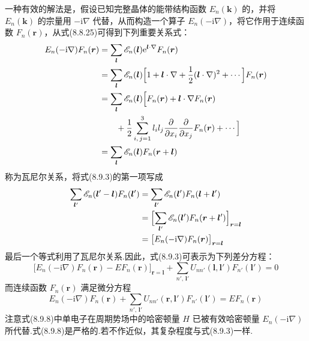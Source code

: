 一种有效的解法是，假设已知完整晶体的能带结构函数 $E_{n}(\boldsymbol{k})$ 的，并将 $E_{n}(\boldsymbol{k})$ 的宗量用 $-\mathrm{i}\nabla$ 代替，从而构造一个算子 $E_{n}(-\mathrm{i}\nabla)$，将它作用于连续函数 $F_{n}(\boldsymbol{r})$，从式(8.8.25)可得到下列重要关系式：
\begin{equation}
\begin{aligned}
  E_{n}(-\mathrm{i}\nabla)F_{n}(\boldsymbol{r})
  &=\sum_{\boldsymbol{l}}\mathscr{E}_{n}(\boldsymbol{l})\mathrm{e}^{\boldsymbol{l}\cdot\nabla}F_{n}(\boldsymbol{r})\\
  &=\sum_{\boldsymbol{l}}\mathscr{E}_{n}(\boldsymbol{l})\Bigl[1+\boldsymbol{l}\cdot\nabla+\frac{1}{2}(\boldsymbol{l}\cdot\nabla)^{2}+\cdots\Bigr]F_{n}(\boldsymbol{r})\\
  &=\sum_{\boldsymbol{l}}\mathscr{E}_{n}(\boldsymbol{l})\Bigl[F_{n}(\boldsymbol{r})+\boldsymbol{l}\cdot\nabla F_{n}(\boldsymbol{r})\\
  &\qquad+\frac{1}{2}\sum_{i,\,j=1}^{3}l_{i}l_{j}\frac{\partial}{\partial x_{i}}\frac{\partial}{\partial x_{j}}F_{n}(\boldsymbol{r})+\cdots\Bigr]\\
  &=\sum_{\boldsymbol{l}}\mathscr{E}_{n}(\boldsymbol{l})F_{n}(\boldsymbol{r}+\boldsymbol{l})
\end{aligned}
\end{equation}
称为瓦尼尔关系，将式(8.9.3)的第一项写成
\begin{equation}
\begin{aligned}
  \sum_{\boldsymbol{l}'}\mathscr{E}_{n}(\boldsymbol{l}'-\boldsymbol{l})F_{n}(\boldsymbol{l}')
  &=\sum_{\boldsymbol{l}'}\mathscr{E}_{n}(\boldsymbol{l}')F_{n}(\boldsymbol{l}+\boldsymbol{l}')\\
  &=\Bigl[\sum_{\boldsymbol{l}'}\mathscr{E}_{n}(\boldsymbol{l}')F_{n}(\boldsymbol{r}+\boldsymbol{l}')\Bigr]_{\boldsymbol{r}=\boldsymbol{l}}\\
  &=\bigl[E_{n}(-\mathrm{i}\nabla)F_{n}(\boldsymbol{r})\bigr]_{\boldsymbol{r}=\boldsymbol{l}}
\end{aligned}
\end{equation}
最后一个等式利用了瓦尼尔关系.因此，式(8.9.3)可表示为下列差分方程：
\begin{equation}
  \bigl[E_{n}(-\mathrm{i}\nabla)F_{n}(\boldsymbol{r})-EF_{n}(\boldsymbol{r})\bigr]_{\boldsymbol{r}=\boldsymbol{l}}
  +\sum_{n',\,\boldsymbol{l}'}U_{nn'}(\boldsymbol{l},\boldsymbol{l}')F_{n'}(\boldsymbol{l}')=0
\end{equation}
而连续函数 $F_{n}(\boldsymbol{r})$ 满足微分方程
\begin{equation}
  E_{n}(-\mathrm{i}\nabla)F_{n}(\boldsymbol{r})
  +\sum_{n',\,\boldsymbol{l}'}U_{nn'}(\boldsymbol{r},\boldsymbol{l}')F_{n'}(\boldsymbol{l}')=EF_{n}(\boldsymbol{r})
\end{equation}
注意式(8.9.8)中单电子在周期势场中的哈密顿量 $H$ 已被有效哈密顿量 $E_{n}(-\mathrm{i}\nabla)$ 所代替.式(8.9.8)是严格的.若不作近似，其复杂程度与式(8.9.3)一样.

